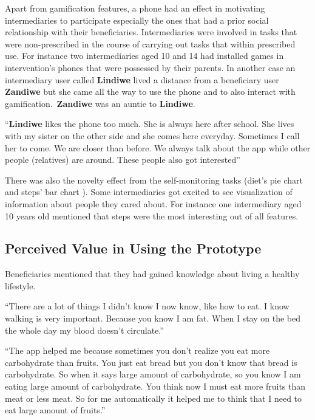 Apart from gamification features, a phone had an effect in motivating intermediaries to participate especially the ones that had a prior social relationship with their beneficiaries. Intermediaries were involved in tasks that were non-prescribed in the course of carrying out tasks that within prescribed use. For instance two intermediaries aged 10 and 14 had installed games in intervention's phones that were possessed by their parents.  In another case an intermediary user called \textbf{Lindiwe} lived a distance from a beneficiary user \textbf{Zandiwe} but she came all the way to use the phone and to also interact with gamification.~\textbf{Zandiwe} was an auntie to \textbf{Lindiwe}.   

 {``\textbf{Lindiwe} likes the phone too much. She is always here after school. She lives with my sister on the other side and she comes here everyday. Sometimes I call her to come. We are closer than before. We always talk about the app while other people (relatives) are around. These people also got interested''} 

There was also the novelty effect from the self-monitoring tasks (diet's pie chart and steps' bar chart ). Some intermediaries got excited to see visualization of information about people they cared about. For instance one intermediary aged 10 years old mentioned that steps were the most interesting out of all features. 

\subsection{Perceived Value in Using the Prototype}
Beneficiaries mentioned that they had gained knowledge about living a healthy lifestyle.

 {``There are a lot of things I didn't know I now know, like how to eat. I know walking is very important. Because you know I am fat. When I stay on the bed the whole day my blood doesn't circulate.''} 

 {``The app helped me because sometimes you don't realize you eat more carbohydrate than fruits. You just eat bread but you don't know that bread is carbohydrate. So when it says large amount of carbohydrate, so you know I am eating large amount of carbohydrate. You think now I must eat more fruits than meat or less meat. So for me automatically it helped me to think that I need to eat large amount of fruits.''}

